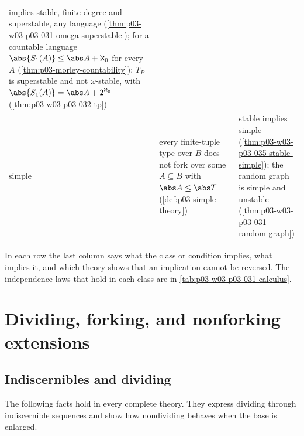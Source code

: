 \begin{longtable}{@{}p{}p{}p{}@{}}
implies stable, finite degree and superstable, any language
(\cref{thm:p03-w03-p03-031-omega-superstable}); for a countable language
\(\abs{S_1(A)}\leq\abs A+\aleph_0\) for every \(A\)
(\cref{thm:p03-morley-countability}); \(T_P\) is superstable and not
\(\omega\)-stable, with \(\abs{S_1(A)}=\abs A+2^{\aleph_0}\)
(\cref{thm:p03-w03-p03-032-tp}) \\
\addlinespace
simple & every finite-tuple type over \(B\) does not fork over some
\(A\subseteq B\) with \(\abs A\leq\abs T\) (\cref{def:p03-simple-theory}) &
stable implies simple (\cref{thm:p03-w03-p03-035-stable-simple}); the random
graph is simple and unstable (\cref{thm:p03-w03-p03-031-random-graph}) \\
\bottomrule
\end{longtable}

In each row the last column says what the class or condition implies,
what implies it, and which theory shows that an implication cannot be
reversed.  The
independence laws that hold in each class are in
\cref{tab:p03-w03-p03-031-calculus}.

\section{Dividing, forking, and nonforking extensions}
\label{sec:p03-w03-p03-031-basic}

\subsection{Indiscernibles and dividing}
\label{sec:p03-w03-p03-031-toolkit}

The following facts hold in every complete theory.  They express dividing
through indiscernible sequences and show how nondividing behaves when the
base is enlarged.

